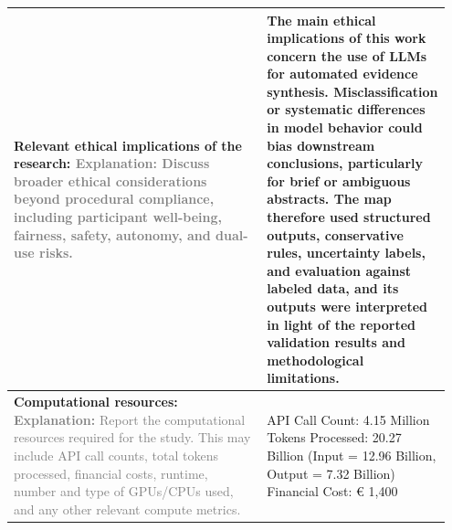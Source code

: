 \documentclass[12pt]{article}
\begin{document}
\begin{landscape}
{\begin{longtable}{|p{0.55\linewidth}|p{0.40\linewidth}|}
\textbf{Relevant ethical implications of the research:} \textcolor{gray}{\footnotesize \textbf{Explanation:} Discuss broader ethical considerations beyond procedural compliance, including participant well-being, fairness, safety, autonomy, and dual-use risks.} & The main ethical implications of this work concern the use of LLMs for automated evidence synthesis. Misclassification or systematic differences in model behavior could bias downstream conclusions, particularly for brief or ambiguous abstracts. The map therefore used structured outputs, conservative rules, uncertainty labels, and evaluation against labeled data, and its outputs were interpreted in light of the reported validation results and methodological limitations. \\
\hline
\textbf{Computational resources:} \textcolor{gray}{\footnotesize \textbf{Explanation:} Report the computational resources required for the study. This may include API call counts, total tokens processed, financial costs, runtime, number and type of GPUs/CPUs used, and any other relevant compute metrics.} & API Call Count: 4.15 Million Tokens Processed: 20.27 Billion (Input = 12.96 Billion, Output = 7.32 Billion) Financial Cost: € 1,400 \\
\hline
\end{longtable}
}
\end{landscape}
\restoregeometry
\end{document}
